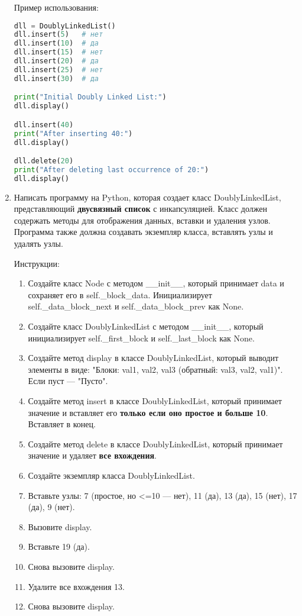 \begin{enumerate}
Пример использования:
\begin{lstlisting}[language=Python]
dll = DoublyLinkedList()
dll.insert(5)   # нет
dll.insert(10)  # да
dll.insert(15)  # нет
dll.insert(20)  # да
dll.insert(25)  # нет
dll.insert(30)  # да

print("Initial Doubly Linked List:")
dll.display()

dll.insert(40)
print("After inserting 40:")
dll.display()

dll.delete(20)
print("After deleting last occurrence of 20:")
dll.display()
\end{lstlisting}

\item Написать программу на Python, которая создает класс DoublyLinkedList, представляющий \textbf{двусвязный список} с инкапсуляцией. Класс должен содержать методы для отображения данных, вставки и удаления узлов. Программа также должна создавать экземпляр класса, вставлять узлы и удалять узлы.

Инструкции:
\begin{enumerate}
    \item Создайте класс Node с методом \_\_init\_\_, который принимает data и сохраняет его в self.\_block\_data. Инициализирует self.\_data\_block\_next и self.\_data\_block\_prev как None.
    \item Создайте класс DoublyLinkedList с методом \_\_init\_\_, который инициализирует self.\_first\_block и self.\_last\_block как None.
    \item Создайте метод display в классе DoublyLinkedList, который выводит элементы в виде: "Блоки: val1, val2, val3 (обратный: val3, val2, val1)". Если пуст — "Пусто".
    \item Создайте метод insert в классе DoublyLinkedList, который принимает значение и вставляет его \textbf{только если оно простое и больше 10}. Вставляет в конец.
    \item Создайте метод delete в классе DoublyLinkedList, который принимает значение и удаляет \textbf{все вхождения}.
    \item Создайте экземпляр класса DoublyLinkedList.
    \item Вставьте узлы: 7 (простое, но <=10 — нет), 11 (да), 13 (да), 15 (нет), 17 (да), 9 (нет).
    \item Вызовите display.
    \item Вставьте 19 (да).
    \item Снова вызовите display.
    \item Удалите все вхождения 13.
    \item Снова вызовите display.
\end{enumerate}


\end{enumerate}
